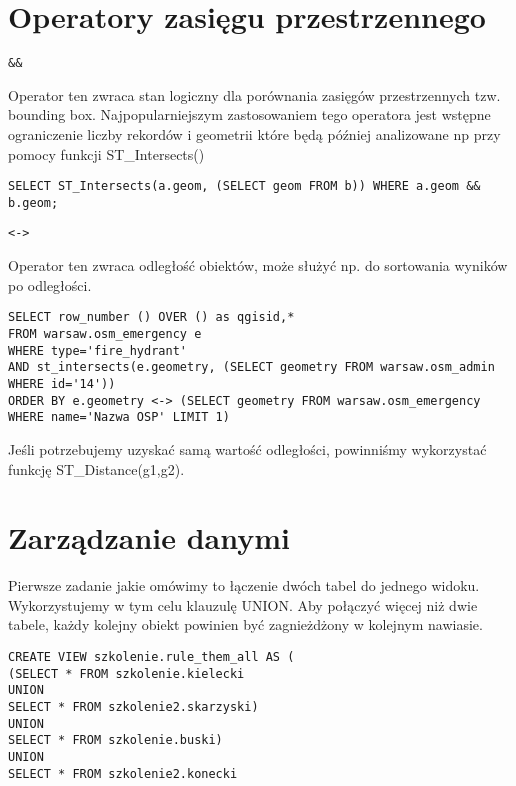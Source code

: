\section{Operatory zasięgu przestrzennego}

\begin{lstlisting}
&&
\end{lstlisting}
Operator ten zwraca stan logiczny dla porównania zasięgów przestrzennych tzw. bounding box. Najpopularniejszym  zastosowaniem tego operatora jest wstępne ograniczenie liczby rekordów i geometrii które będą później analizowane np przy pomocy funkcji ST\_Intersects()
\begin{lstlisting}
SELECT ST_Intersects(a.geom, (SELECT geom FROM b)) WHERE a.geom && b.geom;
\end{lstlisting}

\begin{lstlisting}
<->
\end{lstlisting}
Operator ten zwraca odległość obiektów, może służyć np. do sortowania wyników po odległości.
\begin{lstlisting}
SELECT row_number () OVER () as qgisid,* 
FROM warsaw.osm_emergency e 
WHERE type='fire_hydrant' 
AND st_intersects(e.geometry, (SELECT geometry FROM warsaw.osm_admin WHERE id='14'))
ORDER BY e.geometry <-> (SELECT geometry FROM warsaw.osm_emergency WHERE name='Nazwa OSP' LIMIT 1)	
\end{lstlisting}
Jeśli potrzebujemy uzyskać samą wartość odległości, powinniśmy wykorzystać funkcję ST\_Distance(g1,g2). 

\section{Zarządzanie danymi}
Pierwsze zadanie jakie omówimy to łączenie dwóch tabel do jednego widoku. Wykorzystujemy w tym celu klauzulę UNION. Aby połączyć więcej niż dwie tabele, każdy kolejny obiekt powinien być zagnieżdżony w kolejnym nawiasie.

\begin{lstlisting}
CREATE VIEW szkolenie.rule_them_all AS (
(SELECT * FROM szkolenie.kielecki 
UNION 
SELECT * FROM szkolenie2.skarzyski)
UNION 
SELECT * FROM szkolenie.buski)
UNION
SELECT * FROM szkolenie2.konecki
\end{lstlisting}